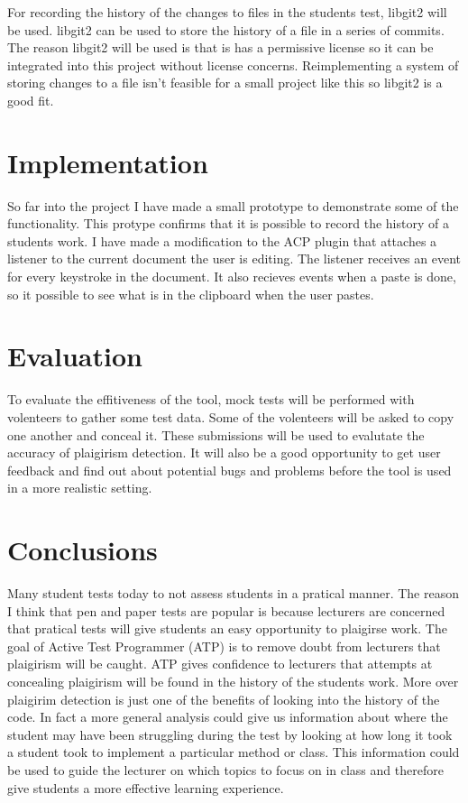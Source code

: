 \documentclass[twocolumn]{article}
\begin{document}
For recording the history of the changes to files in the students test, libgit2
will be used. libgit2 can be used to store the history of a file in a series of
commits. The reason libgit2 will be used is that is has a permissive license so
it can be integrated into this project without license concerns. Reimplementing
a system of storing changes to a file isn't feasible for a small project like
this so libgit2 is a good fit.


\section{Implementation}
So far into the project I have made a small prototype to demonstrate some of the
functionality. This protype confirms that it is possible to record the history
of a students work. I have made a modification to the ACP plugin that attaches a
listener to the current document the user is editing. The listener receives an
event for every keystroke in the document. It also recieves events when a paste
is done, so it possible to see what is in the clipboard when the user pastes.

\section{Evaluation}
To evaluate the effitiveness of the tool, mock tests will be performed with
volenteers to gather some test data. Some of the volenteers will be asked to
copy one another and conceal it. These submissions will be used to evalutate the
accuracy of plaigirism detection. It will also be a good opportunity to get user
feedback and find out about potential bugs and problems before the tool is used
in a more realistic setting.

\section{Conclusions}
Many student tests today to not assess students in a pratical manner. The reason
I think that pen and paper tests are popular is because lecturers are concerned
that pratical tests will give students an easy opportunity to plaigirse work.
The goal of Active Test Programmer (ATP) is to remove doubt from lecturers that
plaigirism will be caught. ATP gives confidence to lecturers that attempts at
concealing plaigirism will be found in the history of the students work. More
over plaigirim detection is just one of the benefits of looking into the history
of the code. In fact a more general analysis could give us information about
where the student may have been struggling during the test by looking at how
long it took a student took to implement a particular method or class. This
information could be used to guide the lecturer on which topics to focus on in
class and therefore give students a more effective learning experience.



\end{document}
